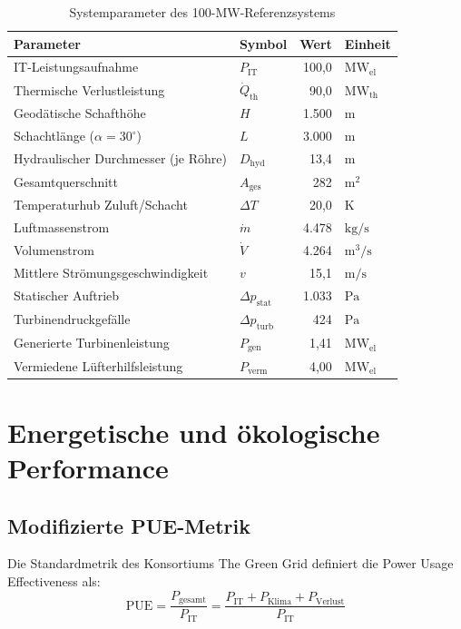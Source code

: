 \documentclass[journal]{IEEEtran}
\begin{document}
\begin{table}[htbp]
\caption{Systemparameter des 100-MW-Referenzsystems}
\label{tab:system_params}
\centering
\begin{tabularx}{\columnwidth}{l l r l}
\toprule
\textbf{Parameter} & \textbf{Symbol} & \textbf{Wert} & \textbf{Einheit} \\
\midrule
IT-Leistungsaufnahme & $P_{\text{IT}}$ & 100,0 & $\text{MW}_{\text{el}}$ \\
Thermische Verlustleistung & $\dot{Q}_{\text{th}}$ & 90,0 & $\text{MW}_{\text{th}}$ \\
Geodätische Schafthöhe & $H$ & 1.500 & $\text{m}$ \\
Schachtlänge ($\alpha = 30^\circ$) & $L$ & 3.000 & $\text{m}$ \\
Hydraulischer Durchmesser (je Röhre) & $D_{\text{hyd}}$ & 13,4 & $\text{m}$ \\
Gesamtquerschnitt & $A_{\text{ges}}$ & 282 & $\text{m}^2$ \\
Temperaturhub Zuluft/Schacht & $\Delta T$ & 20,0 & $\text{K}$ \\
Luftmassenstrom & $\dot{m}$ & 4.478 & $\text{kg/s}$ \\
Volumenstrom & $\dot{V}$ & 4.264 & $\text{m}^3/\text{s}$ \\
Mittlere Strömungsgeschwindigkeit & $v$ & 15,1 & $\text{m/s}$ \\
Statischer Auftrieb & $\Delta p_{\text{stat}}$ & 1.033 & $\text{Pa}$ \\
Turbinendruckgefälle & $\Delta p_{\text{turb}}$ & 424 & $\text{Pa}$ \\
Generierte Turbinenleistung & $P_{\text{gen}}$ & 1,41 & $\text{MW}_{\text{el}}$ \\
Vermiedene Lüfterhilfsleistung & $P_{\text{verm}}$ & 4,00 & $\text{MW}_{\text{el}}$ \\
\bottomrule
\end{tabularx}
\end{table}

\section{Energetische und ökologische Performance}

\subsection{Modifizierte PUE-Metrik}
Die Standardmetrik des Konsortiums The Green Grid definiert die Power Usage Effectiveness als:
\begin{equation}
\text{PUE} = \frac{P_{\text{gesamt}}}{P_{\text{IT}}} = \frac{P_{\text{IT}} + P_{\text{Klima}} + P_{\text{Verlust}}}{P_{\text{IT}}}
\end{equation}
\end{document}
